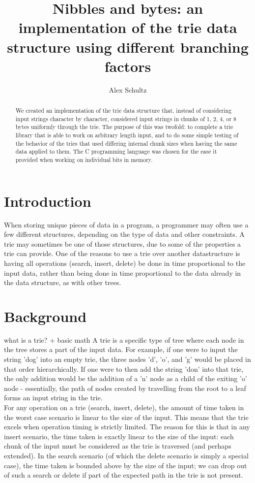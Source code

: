 \documentclass{llncs}
\title{Nibbles and bytes: an implementation of the trie data structure using different branching factors}
\author{Alex Schultz}
\institute{Tufts University}
\begin{document}
\maketitle

\begin{abstract}
We created an implementation of the trie data structure that, instead of considering input strings character by character, considered input strings in chunks of 1, 2, 4, or 8 bytes uniformly through the trie. The purpose of this was twofold: to complete a trie library that is able to work on arbitrary length input, and to do some simple testing of the behavior of the tries that used differing internal chunk sizes when having the same data applied to them. The C programming language was chosen for the ease it provided when working on individual bits in memory.
\end{abstract}

\section{Introduction}
\label{Introduction}
When storing unique pieces of data in a program, a programmer may often use a few different structures, depending on the type of data and other constraints. A trie may sometimes be one of those structures, due to some of the properties a trie can provide. One of the reasons to use a trie over another datastructure is having all operations (search, insert, delete) be done in time proportional to the input data, rather than being done in time proportional to the data already in the data structure, as with other trees.

\section{Background}
what is a trie? + basic math
A trie is a specific type of tree where each node in the tree stores a part of the input data. For example, if one were to input the string 'dog' into an empty trie, the three nodes 'd', 'o', and 'g' would be placed in that order hierarchically. If one were to then add the string 'don' into that trie, the only addition would be the addition of a 'n' node as a child of the exiting 'o' node - essentially, the path of nodes created by travelling from the root to a leaf forms an input string in the trie. \\ %
For any operation on a trie (search, insert, delete), the amount of time taken in the worst case scenario is linear to the size of the input. This means that the trie excels when operation timing is strictly limited. The reason for this is that in any insert scenario, the time taken is exactly linear to the size of the input: each chunk of the input must be considered as the trie is traversed (and perhaps extended). In the search scenario (of which the delete scenario is simply a special case), the time taken is bounded above by the size of the input; we can drop out of such a search or delete if part of the expected path in the trie is not present. \\
\newpage
\end{document}
